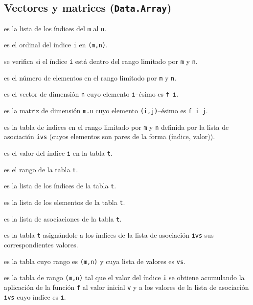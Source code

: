 \subsection{Vectores y matrices (\texttt{Data.Array})}

\begin{enumerate*}
\item {} es la lista de los índices del \verb|m| al \verb|n|.
\item {} es el ordinal del índice \verb|i| en \verb|(m,n)|.
\item {} se verifica si el índice \verb|i| está dentro
  del rango limitado por \verb|m| y \verb|n|.
\item {} es el número de elementos en el rango
  limitado por \verb|m| y \verb|n|.
\item \verba{(array (1,n) [(i, f i) | i <- [1..n])} es el vector de dimensión
  \verb|n| cuyo elemento \verb|i|--ésimo es \verb|f i|. 
\item {} 
  es la matriz de dimensión \verb|m.n| cuyo elemento \verb|(i,j)|--ésimo es
  \verb|f i j|.  
\item {} es la tabla de índices en el rango limitado
  por \verb|m| y \verb|n| definida por la lista de asociación \verb|ivs|
  (cuyos elementos son pares de la forma (índice, valor)).
\item {} es el valor del índice \verb|i| en la tabla \verb|t|.
\item {} es el rango de la tabla \verb|t|.
\item {} es la lista de los índices de la tabla \verb|t|.
\item {} es la lista de los elementos de la tabla \verb|t|.
\item {} es la lista de asociaciones de la tabla \verb|t|.
\item {} es la tabla \verb|t| asignándole a los índices de la
  lista de asociación \verb|ivs| sus correspondientes valores.
\item {} es la tabla cuyo rango es \verb|(m,n)| y
  cuya lista de valores es \verb|vs|.
\item {} es la tabla de rango \verb|(m,n)|
  tal que el valor del índice \verb|i| se obtiene acumulando la aplicación de
  la función \verb|f| al valor inicial \verb|v| y a los valores de la lista
  de asociación \verb|ivs| cuyo índice es \verb|i|.
\end{enumerate*}

